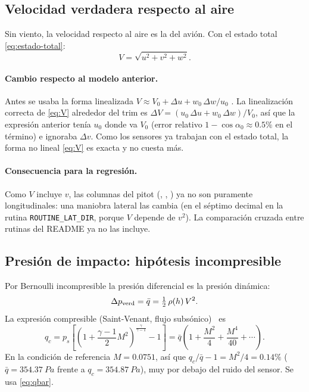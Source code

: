 \documentclass[11pt,a4paper]{article}
\begin{document}
\subsection{Velocidad verdadera respecto al aire}

Sin viento, la velocidad respecto al aire es la del avión. Con el estado total
\eqref{eq:estado-total}:
\begin{equation}
  V = \sqrt{u^2 + v^2 + w^2}.
  \label{eq:V}
\end{equation}

\paragraph{Cambio respecto al modelo anterior.} Antes se usaba la forma
linealizada $V \approx V_0 + \Delta u + w_0\,\Delta w/u_0$ \cite{morelli}.
La linealización correcta de \eqref{eq:V} alrededor del trim es
$\Delta V = (u_0\,\Delta u + w_0\,\Delta w)/V_0$, así que la expresión
anterior tenía $u_0$ donde va $V_0$ (error relativo $1 - \cos\alpha_0 \approx
0.5\%$ en el término) e ignoraba $\Delta v$. Como los sensores ya trabajan
con el estado total, la forma no lineal \eqref{eq:V} es exacta y no cuesta
más.

\paragraph{Consecuencia para la regresión.} Como $V$ incluye $v$, las columnas
del pitot (, , ) ya no son
puramente longitudinales: una maniobra lateral las cambia (en el séptimo
decimal en la rutina \texttt{ROUTINE\_LAT\_DIR}, porque $V$ depende de $v^2$).
La comparación cruzada entre rutinas del README ya no las incluye.

\subsection{Presión de impacto: hipótesis incompresible}

Por Bernoulli incompresible la presión diferencial es la presión dinámica:
\begin{equation}
  \Delta p_{\text{verd}} = \bar q = \tfrac12\,\rho(h)\,V^2 .
  \label{eq:qbar}
\end{equation}
La expresión compresible (Saint-Venant, flujo subsónico)~\cite{anderson} es
\begin{equation}
  q_c = p_s\left[\left(1 + \frac{\gamma-1}{2}M^2\right)^{\frac{\gamma}{\gamma-1}} - 1\right]
      = \bar q\left(1 + \frac{M^2}{4} + \frac{M^4}{40} + \cdots\right).
\end{equation}
En la condición de referencia $M = 0.0751$, así que $q_c/\bar q - 1 = M^2/4 =
0.14\%$ ($\bar q = \SI{354.37}{Pa}$ frente a $q_c = \SI{354.87}{Pa}$), muy por
debajo del ruido del sensor. Se usa \eqref{eq:qbar}.
\end{document}
